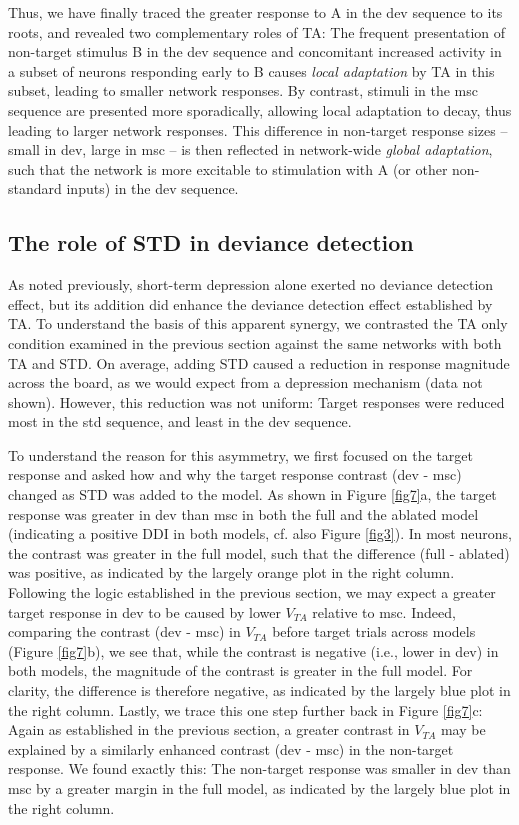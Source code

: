 \documentclass[pdflatex,referee,iicol,sn-basic]{sn-jnl}
\theoremstyle{thmstyleone}%
\theoremstyle{thmstyletwo}%
\theoremstyle{thmstylethree}%
\begin{document}
Thus, we have finally traced the greater response to A in the dev sequence to its roots, and revealed two complementary roles of TA: The frequent presentation of non-target stimulus B in the dev sequence and concomitant increased activity in a subset of neurons responding early to B causes \emph{local adaptation} by TA in this subset, leading to smaller network responses. By contrast, stimuli in the msc sequence are presented more sporadically, allowing local adaptation to decay, thus leading to larger network responses. This difference in non-target response sizes -- small in dev, large in msc -- is then reflected in network-wide \emph{global adaptation}, such that the network is more excitable to stimulation with A (or other non-standard inputs) in the dev sequence.

\subsection{The role of STD in deviance detection}\label{sec-std}

As noted previously, short-term depression alone exerted no deviance detection effect, but its addition did enhance the deviance detection effect established by TA. To understand the basis of this apparent synergy, we contrasted the TA only condition examined in the previous section against the same networks with both TA and STD. On average, adding STD caused a reduction in response magnitude across the board, as we would expect from a depression mechanism (data not shown). However, this reduction was not uniform: Target responses were reduced most in the std sequence, and least in the dev sequence.

To understand the reason for this asymmetry, we first focused on the target response and asked how and why the target response contrast (dev - msc) changed as STD was added to the model. As shown in Figure \ref{fig7}a, the target response was greater in dev than msc in both the full and the ablated model (indicating a positive DDI in both models, cf. also Figure \ref{fig3}). In most neurons, the contrast was greater in the full model, such that the difference (full - ablated) was positive, as indicated by the largely orange plot in the right column.
Following the logic established in the previous section, we may expect a greater target response in dev to be caused by lower $V_{TA}$ relative to msc. Indeed, comparing the contrast (dev - msc) in $V_{TA}$ before target trials across models (Figure \ref{fig7}b), we see that, while the contrast is negative (i.e., lower in dev) in both models, the magnitude of the contrast is greater in the full model. For clarity, the difference is therefore negative, as indicated by the largely blue plot in the right column.
Lastly, we trace this one step further back in Figure \ref{fig7}c: Again as established in the previous section, a greater contrast in $V_{TA}$ may be explained by a similarly enhanced contrast (dev - msc) in the non-target response. We found exactly this: The non-target response was smaller in dev than msc by a greater margin in the full model, as indicated by the largely blue plot in the right column.
\end{document}
